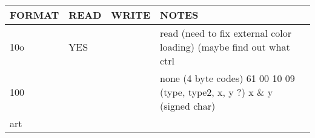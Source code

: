 \begin{longtable}[]{@{}llll@{}}
\toprule
\begin{minipage}[b]{0.19\columnwidth}\raggedright
FORMAT\strut
\end{minipage} & \begin{minipage}[b]{0.22\columnwidth}\raggedright
READ\strut
\end{minipage} & \begin{minipage}[b]{0.25\columnwidth}\raggedright
WRITE\strut
\end{minipage} & \begin{minipage}[b]{0.22\columnwidth}\raggedright
NOTES\strut
\end{minipage}\tabularnewline
\midrule
\endhead
\begin{minipage}[t]{0.19\columnwidth}\raggedright
10o\strut
\end{minipage} & \begin{minipage}[t]{0.22\columnwidth}\raggedright
YES\strut
\end{minipage} & \begin{minipage}[t]{0.25\columnwidth}\raggedright
\strut
\end{minipage} & \begin{minipage}[t]{0.22\columnwidth}\raggedright
read (need to fix external color loading) (maybe find out what
ctrl\strut
\end{minipage}\tabularnewline
\begin{minipage}[t]{0.19\columnwidth}\raggedright
100\strut
\end{minipage} & \begin{minipage}[t]{0.22\columnwidth}\raggedright
\strut
\end{minipage} & \begin{minipage}[t]{0.25\columnwidth}\raggedright
\strut
\end{minipage} & \begin{minipage}[t]{0.22\columnwidth}\raggedright
none (4 byte codes) 61 00 10 09 (type, type2, x, y ?) x \& y (signed
char)\strut
\end{minipage}\tabularnewline
\begin{minipage}[t]{0.19\columnwidth}\raggedright
art\strut
\end{minipage} & \begin{minipage}[t]{0.22\columnwidth}\raggedright
\strut
\end{minipage} & \begin{minipage}[t]{0.25\columnwidth}\raggedright
\strut
\end{minipage} & \begin{minipage}[t]{0.22\columnwidth}\raggedright

\end{minipage}
\end{longtable}
